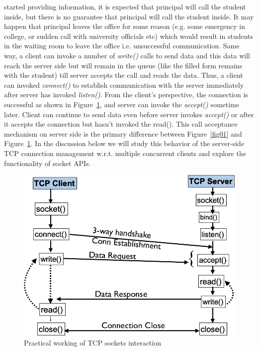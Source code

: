 \begin{multicols}{2}
started providing information, it is expected that principal will call the student inside, but there is no guarantee that principal will call the student inside. It may happen that principal leaves the office for some reason (e.g. some emergency in college, or sudden call with university officials etc) which would result in students in the waiting room to leave the office i.e. unsuccessful communication. Same way, a client can invoke a number of \textit{write()} calls to send data and this data will reach the server side but will remain in the queue (like the filled form remains with the student) till server accepts the call and reads the data. Thus, a client can invoked \textit{connect()} to establish communication with the server immediately after server has invoked \textit{listen()}. From the client’s perspective, the connection is successful as shown in Figure~\ref{fig02}, and server can invoke the \textit{accept()} sometime later. Client can continue to send data even before server invokes \textit{accept()} or after it accepts the connection but hasn’t invoked the read(). This call acceptance mechanism on server side is the primary difference between Figure~\ref{fig01} and Figure~\ref{fig02}. In the discussion below we will study this behavior of the server-side TCP connection management w.r.t. multiple concurrent clients and explore the functionality of socket APIs.

\begin{figure}[H]
\centering
\includegraphics[scale=1.2]{src/Figures/chap1/fig02.jpg}
\caption{Practical working of TCP sockets interaction}\label{fig02}
\end{figure}



\end{multicols}
